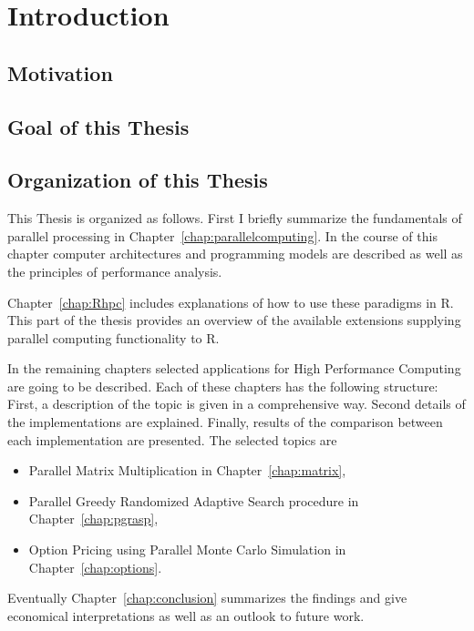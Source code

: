 \chapter{Introduction}
\section{Motivation}
\section{Goal of this Thesis}
\section{Organization of this Thesis}

This Thesis is organized as follows. First I briefly summarize the
fundamentals of parallel processing in
Chapter~\ref{chap:parallelcomputing}. In the course of this chapter
computer architectures and programming models are described as well as the
principles of performance analysis.

Chapter~\ref{chap:Rhpc} includes explanations of how to use these
paradigms in R. This part of
the thesis provides an overview of the
available extensions supplying parallel computing functionality to R.

In the remaining chapters selected applications for High Performance
Computing are going to be
described. Each of these chapters has the following structure: First,
a description of the topic is given in a comprehensive way. Second
details of the implementations are explained. Finally, results of the
comparison between each implementation are presented. The selected
topics are
\begin{itemize}
\item Parallel Matrix Multiplication in Chapter~\ref{chap:matrix},
\item Parallel Greedy Randomized Adaptive Search procedure in
  Chapter~\ref{chap:pgrasp},
\item Option Pricing using Parallel Monte Carlo Simulation in
  Chapter~\ref{chap:options}. 
\end{itemize}
Eventually Chapter~\ref{chap:conclusion} summarizes
the findings and give economical interpretations as well as an outlook
to future work.
